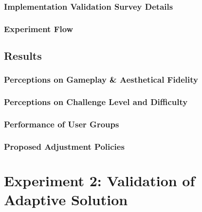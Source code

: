 \subsubsection{Implementation Validation Survey Details}


\subsubsection{Experiment Flow}


\subsection{Results}

\subsubsection{Perceptions on Gameplay \& Aesthetical Fidelity}

\subsubsection{Perceptions on Challenge Level and Difficulty}

\subsubsection{Performance of User Groups}

\subsubsection{Proposed Adjustment Policies}


\section{Experiment 2: Validation of Adaptive Solution}
\label{sec:experiment-methodology}

